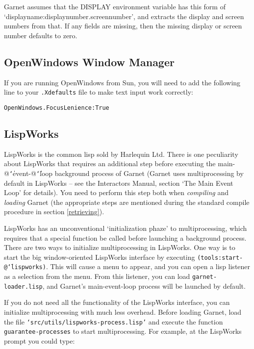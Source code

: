 \documentclass{report}
\newenvironment{programexample}{\begin{alltt}}{\end{alltt}}
\begin{document}
Garnet assumes that the DISPLAY environment variable has this form of
`displayname:displaynumber.screennumber', and extracts the display and
screen numbers from that.  If any fields are missing, then the missing
display or screen number defaults to zero.


\subsection{OpenWindows Window Manager}
 

If you are running OpenWindows from Sun, you will need to add the
following line to your \texttt{.Xdefaults} file to make text input work
correctly:
\begin{programexample}
  OpenWindows.FocusLenience: True
\end{programexample}


\subsection{LispWorks}
\label{lispworks}
  

LispWorks is the common lisp sold by Harlequin Ltd.  There is one
peculiarity about LispWorks that requires an additional step before
executing the main-@{\tt\char`\|}event-@{\tt\char`\|}loop background
process of Garnet (Garnet uses multiprocessing by default in LispWorks
-- see the Interactors Manual, section `The Main Event Loop' for
details).  You need to perform this step both when {\it compiling} and
{\it loading} Garnet (the appropriate steps are mentioned during the
standard compile procedure in section \ref{retrieving}).

LispWorks has an unconventional `initialization phaze' to
multiprocessing, which requires that a special function be called
before launching a background process.  There are two ways to
initialize multiprocessing in LispWorks.  One way is to start the big
window-oriented LispWorks interface by executing
\texttt{(tools:start-@{\tt\char`\|}lispworks)}.  This will cause a menu to
appear, and you can open a lisp listener as a selection from the menu.
From this listener, you can load \texttt{garnet-loader.lisp}, and Garnet's
main-event-loop process will be launched by default.

If you do not need all the functionality of the LispWorks interface,
you can initialize multiprocessing with much less overhead.  Before
loading Garnet, load the file \texttt{`src/utils/lispworks-process.lisp'}
and execute the function \texttt{guarantee-processes} to start
multiprocessing.  For example, at the LispWorks prompt you could type:
\end{document}
